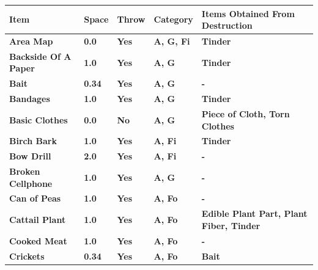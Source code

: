 			\begin{longtable}{|C{10.555em}|C{4.0em}|C{4.0em}|C{6.445em}|C{11.055em}|}
			    \toprule
			     \textcolor[rgb]{ 1,  1,  1}{\textbf{Item}} & \textcolor[rgb]{ 1,  1,  1}{\textbf{Space}} & \textcolor[rgb]{ 1,  1,  1}{\textbf{Throw }} & \textcolor[rgb]{ 1,  1,  1}{\textbf{Category}} & \textcolor[rgb]{ 1,  1,  1}{\textbf{Items Obtained From Destruction}} \\
			    \midrule
			     \textbf{Area Map} & \textbf{0.0} & \textbf{Yes} & \textbf{A, G, Fi} & \textbf{Tinder} \\
			    \midrule
			     \textbf{Backside Of A Paper} & \textbf{1.0} & \textbf{Yes} & \textbf{A, G} & \textbf{Tinder} \\
			    \midrule
			     \textbf{Bait} & \textbf{0.34} & \textbf{Yes} & \textbf{A, G} & \textbf{-} \\
			    \midrule
			     \textbf{Bandages} & \textbf{1.0} & \textbf{Yes} & \textbf{A, G} & \textbf{Tinder} \\
			    \midrule
			     \textbf{Basic Clothes} & \textbf{0.0} & \textbf{No} & \textbf{A, G} & \textbf{Piece of Cloth, Torn Clothes} \\
			    \midrule
			     \textbf{Birch Bark} & \textbf{1.0} & \textbf{Yes} & \textbf{A, Fi} & \textbf{Tinder} \\
			    \midrule
			     \textbf{Bow Drill} & \textbf{2.0} & \textbf{Yes} & \textbf{A, Fi} & \textbf{-} \\
			    \midrule
			     \textbf{Broken Cellphone} & \textbf{1.0} & \textbf{Yes} & \textbf{A, G} & \textbf{-} \\
			    \midrule
			     \textbf{Can of Peas} & \textbf{1.0} & \textbf{Yes} & \textbf{A, Fo} & \textbf{-} \\
			    \midrule
			     \textbf{Cattail Plant} & \textbf{1.0} & \textbf{Yes} & \textbf{A, Fo} & \textbf{Edible Plant Part, Plant Fiber, Tinder} \\
			    \midrule
			     \textbf{Cooked Meat} & \textbf{1.0} & \textbf{Yes} & \textbf{A, Fo} & \textbf{-} \\
			    \midrule
			     \textbf{Crickets} & \textbf{0.34} & \textbf{Yes} & \textbf{A, Fo} & \textbf{Bait} \\

\end{longtable}
